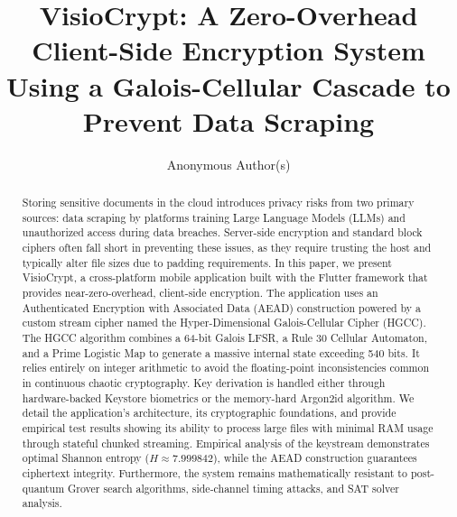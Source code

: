 \documentclass[runningheads]{llncs}
\begin{document}
\title{VisioCrypt: A Zero-Overhead Client-Side Encryption System Using a Galois-Cellular Cascade to Prevent Data Scraping}

\author{Anonymous Author(s)}

\maketitle

\begin{abstract}
Storing sensitive documents in the cloud introduces privacy risks from two primary sources: data scraping by platforms training Large Language Models (LLMs) and unauthorized access during data breaches. Server-side encryption and standard block ciphers often fall short in preventing these issues, as they require trusting the host and typically alter file sizes due to padding requirements. In this paper, we present VisioCrypt, a cross-platform mobile application built with the Flutter framework that provides near-zero-overhead, client-side encryption. The application uses an Authenticated Encryption with Associated Data (AEAD) construction powered by a custom stream cipher named the Hyper-Dimensional Galois-Cellular Cipher (HGCC). The HGCC algorithm combines a 64-bit Galois LFSR, a Rule 30 Cellular Automaton, and a Prime Logistic Map to generate a massive internal state exceeding 540 bits. It relies entirely on integer arithmetic to avoid the floating-point inconsistencies common in continuous chaotic cryptography. Key derivation is handled either through hardware-backed Keystore biometrics or the memory-hard Argon2id algorithm. We detail the application's architecture, its cryptographic foundations, and provide empirical test results showing its ability to process large files with minimal RAM usage through stateful chunked streaming. Empirical analysis of the keystream demonstrates optimal Shannon entropy ($H \approx 7.999842$), while the AEAD construction guarantees ciphertext integrity. Furthermore, the system remains mathematically resistant to post-quantum Grover search algorithms, side-channel timing attacks, and SAT solver analysis.

\end{abstract}
\end{document}
